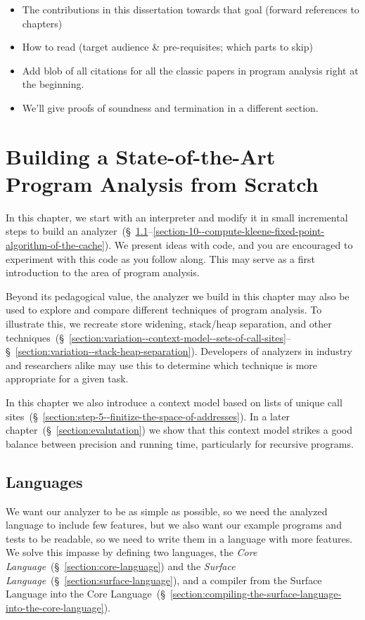 \documentclass[12pt, oneside]{book}
\begin{document}
\begin{itemize}
  \item The contributions in this dissertation towards that goal (forward references to chapters)
  \item How to read (target audience \& pre-requisites; which parts to skip)
  \item Add blob of all citations for all the classic papers in program analysis right at the beginning.
  \item We’ll give proofs of soundness and termination in a different section.
\end{itemize}

\chapter{Building a State-of-the-Art Program Analysis from Scratch}
\label{section:building-a-state-of-the-art-program-analysis-from-scratch}

In this chapter, we start with an interpreter and modify it in small incremental steps to build an analyzer~(§~\ref{section:languages}–\ref{section-10--compute-kleene-fixed-point-algorithm-of-the-cache}). We present ideas with code, and you are encouraged to experiment with this code as you follow along. This may serve as a first introduction to the area of program analysis.

Beyond its pedagogical value, the analyzer we build in this chapter may also be used to explore and compare different techniques of program analysis. To illustrate this, we recreate store widening, stack/heap separation, and other techniques~(§~\ref{section:variation--context-model--sets-of-call-sites}–§~\ref{section:variation--stack-heap-separation}). Developers of analyzers in industry and researchers alike may use this to determine which technique is more appropriate for a given task.

In this chapter we also introduce a context model based on lists of unique call sites~(§~\ref{section:step-5--finitize-the-space-of-addresses}). In a later chapter~(§~\ref{section:evalutation}) we show that this context model strikes a good balance between precision and running time, particularly for recursive programs.

\section{Languages}
\label{section:languages}

We want our analyzer to be as simple as possible, so we need the analyzed language to include few features, but we also want our example programs and tests to be readable, so we need to write them in a language with more features. We solve this impasse by defining two languages, the \emph{Core Language}~(§~\ref{section:core-language}) and the \emph{Surface Language}~(§~\ref{section:surface-language}), and a compiler from the Surface Language into the Core Language~(§~\ref{section:compiling-the-surface-language-into-the-core-language}).
\end{document}
